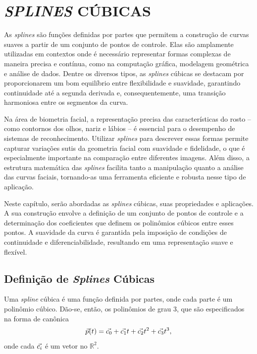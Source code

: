 \chapter{\textit{SPLINES} CÚBICAS} \label{cha:splines}

As \textit{splines} são funções definidas por partes que permitem a construção de curvas suaves a partir de um conjunto de pontos de controle. Elas são amplamente utilizadas em contextos onde é necessário representar formas complexas de maneira precisa e contínua, como na computação gráfica, modelagem geométrica e análise de dados. Dentre os diversos tipos, as \textit{splines} cúbicas se destacam por proporcionarem um bom equilíbrio entre flexibilidade e suavidade, garantindo continuidade até a segunda derivada e, consequentemente, uma transição harmoniosa entre os segmentos da curva.

Na área de biometria facial, a representação precisa das características do rosto -- como contornos dos olhos, nariz e lábios -- é essencial para o desempenho de sistemas de reconhecimento. Utilizar \textit{splines} para descrever essas formas permite capturar variações sutis da geometria facial com suavidade e fidelidade, o que é especialmente importante na comparação entre diferentes imagens. Além disso, a estrutura matemática das \textit{splines} facilita tanto a manipulação quanto a análise das curvas faciais, tornando-as uma ferramenta eficiente e robusta nesse tipo de aplicação.

Neste capítulo, serão abordadas as \textit{splines} cúbicas, suas propriedades e aplicações. A sua construção envolve a definição de um conjunto de pontos de controle e a determinação dos coeficientes que definem os polinômios cúbicos entre esses pontos. A suavidade da curva é garantida pela imposição de condições de continuidade e diferenciabilidade, resultando em uma representação suave e flexível.

\section{Definição de \textit{Splines} Cúbicas}
\label{sec:definicao-splines-cubicas}
Uma \textit{spline} cúbica é uma função definida por partes, onde cada parte é um polinômio cúbico. Dão-se, então, os polinômios de grau 3, que são especificados na forma de canônica
\begin{equation}
    {\vec{p}}(t) = {\vec{c_0}} + {\vec{c_1}}t + {\vec{c_2}}t^2 + {\vec{c_3}}t^3,
\end{equation}
onde cada ${\vec{c_i}}$ é um vetor no $\mathbb{R}^2$.

